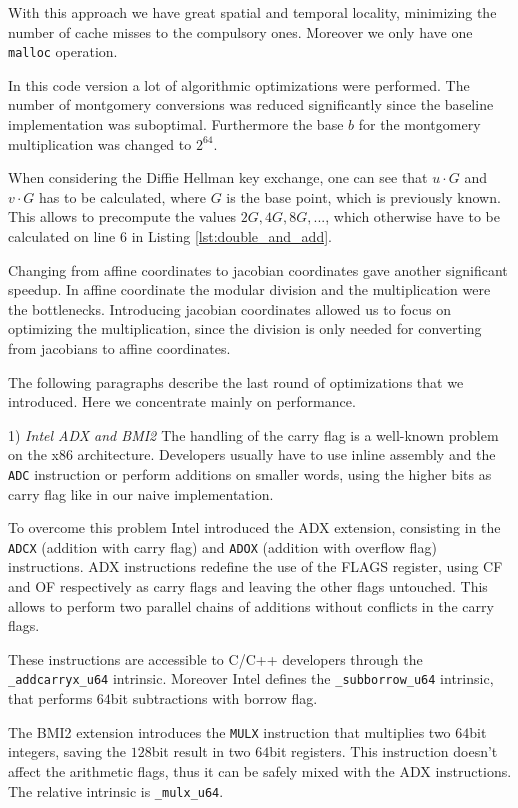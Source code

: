 With this approach we have great spatial and temporal locality, minimizing the number of cache misses to the compulsory ones. Moreover we only have one \texttt{malloc} operation.

In this code version a lot of algorithmic optimizations were performed. The number of montgomery conversions was reduced significantly since the baseline implementation was suboptimal. Furthermore the base $b$ for the montgomery multiplication was changed to $2^{64}$.

When considering the Diffie Hellman key exchange, one can see that $u \cdot G$ and $v \cdot G$ has to be calculated, where $G$ is the base point, which is previously known. This allows to precompute the values $2G, 4G, 8G,...$, which otherwise have to be calculated on line 6 in Listing \ref{lst:double_and_add}.

Changing from affine coordinates to jacobian coordinates gave another significant speedup. In affine coordinate the modular division and the multiplication were the bottlenecks. Introducing jacobian coordinates allowed us to focus on optimizing the multiplication, since the division is only needed for converting from jacobians to affine coordinates.

The following paragraphs describe the last round of optimizations that we introduced. Here we concentrate mainly on performance. 

1) \emph{Intel ADX and BMI2 \cite{Otzturk:2012}} 
The handling of the carry flag is a well-known problem on the x86 architecture. Developers usually have to use inline assembly and the \texttt{ADC} instruction or perform additions on smaller words, using the higher bits as carry flag like in our naive implementation.

To overcome this problem Intel introduced the ADX extension, consisting in the \texttt{ADCX} (addition with carry flag) and \texttt{ADOX} (addition with overflow flag) instructions. ADX instructions redefine the use of the FLAGS register, using CF and OF respectively as carry flags and leaving the other flags untouched. This allows to perform two parallel chains of additions without conflicts in the carry flags.

These instructions are accessible to C/C++ developers through the \texttt{\_addcarryx\_u64} intrinsic. Moreover Intel defines the \texttt{\_subborrow\_u64} intrinsic, that performs $64$bit subtractions with borrow flag.

The BMI2 extension introduces the \texttt{MULX} instruction that multiplies two $64$bit integers, saving the $128$bit result in two $64$bit registers. This instruction doesn't affect the arithmetic flags, thus it can be safely mixed with the ADX instructions. The relative intrinsic is \texttt{\_mulx\_u64}. 

